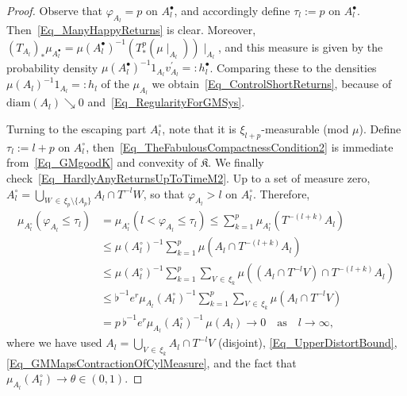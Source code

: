 \documentclass[10pt]{amsart}
\theoremstyle{definition}\newtheorem{defi}[theo]{Definition}\newtheorem{rema}[theo]{Remark}\newtheorem{exam}[theo]{Example}\newtheorem{exem}[theo]{Example}\newtheorem{nota}[theo]{Notation}
\newcommand{\diam}{\mathrm{diam}}
\newcommand{\frkK}{\mathfrak{K}}
\begin{document}
\begin{proof}
Observe that $\varphi_{A_{l}}=p$ on $A_{l}^{\bullet}$, and accordingly define $\tau_{l}:=p$ on $A_{l}^{\bullet}$. Then~\eqref{Eq_ManyHappyReturns} is clear. Moreover, $(T_{A_{l}})_{\ast}\mu_{A_{l}^{\bullet}}=\mu(A_{l}^{\bullet})^{-1}\left(T_{\ast}^{p}(\mu\mid_{A_{l}})\right) \mid_{A_{l}}$, and this measure is given by the probability density $\mu(A_{l}^{\bullet})^{-1} 1_{A_{l}}v_{A_{l}}^{\prime}=:h_{l}^{\bullet}$. Comparing these to the densities $\mu(A_{l})^{-1}1_{A_{l}}=:h_{l}$ of the $\mu_{A_{l}}$ we obtain~\eqref{Eq_ControlShortReturns}, because of $\diam(A_{l})\searrow0$ and~\eqref{Eq_RegularityForGMSys}.

Turning to the escaping part $A_{l}^{\circ}$, note that it is $\xi_{l+p} $-measurable (mod $\mu$). Define $\tau_{l}:=l+p$ on $A_{l}^{\circ}$, then~\eqref{Eq_TheFabulousCompactnessCondition2} is immediate from~\eqref{Eq_GMgoodK} and convexity of $\frkK$. We finally check~\eqref{Eq_HardlyAnyReturnsUpToTimeM2}. Up to a set of measure zero, $A_{l}^{\circ}= {\textstyle\bigcup\nolimits_{W\,\in\,\xi_{p}\setminus\{A_{p}\}}} A_{l}\cap T^{-l}W$, so that $\varphi_{A_{l}}>l$ on $A_{l}^{\circ}$. Therefore,
\begin{align*}
\mu_{A_{l}^{\circ}}\left(\varphi_{A_{l}}\leq\tau_{l}\right) & =\mu _{A_{l}^{\circ}}\left(l<\varphi_{A_{l}}\leq\tau_{l}\right) \leq {\textstyle\sum\nolimits_{k=1}^{p}}
\mu_{A_{l}^{\circ}}\left(T^{-(l+k)}A_{l}\right)\\
& \leq\mu\left(A_{l}^{\circ}\right)^{-1} {\textstyle\sum\nolimits_{k=1}^{p}}
\mu\left(A_{l}\cap T^{-(l+k)}A_{l}\right)\\
& \leq\mu\left(A_{l}^{\circ}\right)^{-1} {\textstyle\sum\nolimits_{k=1}^{p}} {\textstyle\sum\nolimits_{V\,\in\,\xi_{k}}}
\mu\left(\left(A_{l}\cap T^{-l}V\right)\cap T^{-(l+k)}A_{l}\right)\\
& \leq\flat^{-1}e^{r}\mu_{A_{l}}\left(A_{l}^{\circ}\right)^{-1} {\textstyle\sum\nolimits_{k=1}^{p}} {\textstyle\sum\nolimits_{V\,\in\,\xi_{k}}}
\mu\left(A_{l}\cap T^{-l}V\right) \\
& =p\,\flat^{-1}e^{r}\mu_{A_{l}}\left(A_{l}^{\circ}\right)^{-1}\,\mu(A_{l})\longrightarrow0\quad\text{as}\quad l\rightarrow\infty,
\end{align*}
where we have used $A_{l}= {\textstyle\bigcup\nolimits_{V\,\in\,\xi_{k}}} A_{l}\cap T^{-l}V$ (disjoint), \eqref{Eq_UpperDistortBound}, \eqref{Eq_GMMapsContractionOfCylMeasure}, and the fact that $\mu_{A_{l}} (A_{l}^{\circ})\rightarrow\theta\in(0,1)$.
\end{proof}
\end{document}
